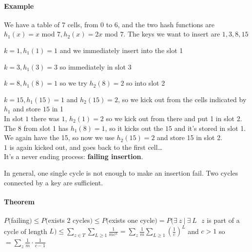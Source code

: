 \documentclass[10pt]{report}
\begin{document}
\paragraph{Example}  We have a table of 7 cells, from $0$ to $6$, and the two hash functions are $h_1(x)=x$ mod $7, h_2(x) = 2x$ mod $7$. The keys we want to insert are $1,3,8,15$
\begin{list}{}{}
	\item $k=1, h_1(1) = 1$ and we immediately insert into the slot 1
	\item $k=3, h_1(3) = 3$ so immediately in slot 3
	\item $k=8, h_1(8) = 1$ so we try $h_2(8) = 2$ so into slot 2
	\item $k=15, h_1(15) = 1$ and $h_2(15) = 2$, so we kick out from the cells indicated by $h_1$ and store $15$ in 1\\
	In slot $1$ there was $1$, $h_2(1) = 2$ so we kick out from there and put 1 in slot 2.\\
	The $8$ from slot 1 has $h_1(8) = 1$, so it kicks out the $15$ and it's stored in slot 1.\\
	We again have the 15, so now we use $h_2(15) = 2$ and store 15 in slot 2.\\
	$1$ is again kicked out, and goes back to the first cell\ldots\\
	It's a never ending process: \textbf{failing insertion}.
\end{list}
In general, one single cycle is not enough to make an insertion fail. Two cycles connected by a key are sufficient.
\paragraph{Theorem} $P($failing$) \leq P($exists 2 cycles$) \leq P($exists one cycle$) = P(\exists\:z\:|\:\exists\:L\:\:\:z$ is part of a cycle of length $L) \leq \sum_{z\in T}\sum_{L\geq 1} \frac{1}{mc^L} = \sum_z\frac{1}{m}\sum_{L\geq 1}\left(\frac{1}{c}\right)^L$ and $c>1$ so $= \sum_z\frac{1}{m}\cdot \frac{1}{c-1}$ 
\end{document}
